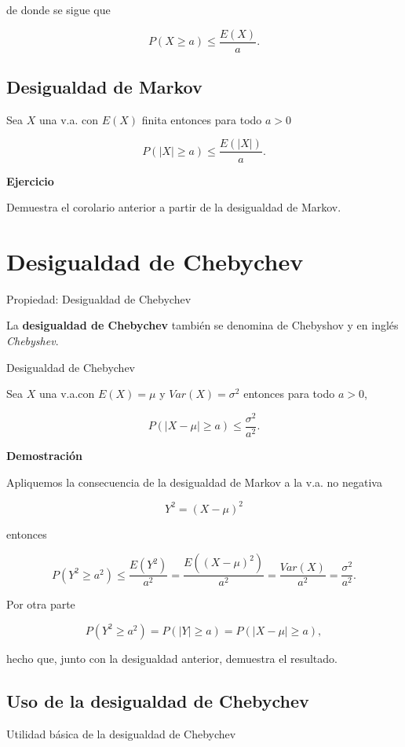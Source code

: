 \documentclass[
  letterpaper,
  DIV=11,
  numbers=noendperiod]{scrreprt}
\begin{document}
de donde se sigue que

\[P(X\geq a)\leq \frac{E(X)}{a}.\]

\subsection{Desigualdad de Markov}\label{desigualdad-de-markov-1}

Sea \(X\) una v.a. con \(E(X)\) finita entonces para todo \(a>0\)

\[P(|X|\geq a )\leq \frac{E(|X|)}{a}.\]

\textbf{Ejercicio}

Demuestra el corolario anterior a partir de la desigualdad de Markov.

\section{Desigualdad de Chebychev}\label{desigualdad-de-chebychev}

Propiedad: Desigualdad de Chebychev

La \textbf{desigualdad de Chebychev} también se denomina de Chebyshov y
en inglés \emph{Chebyshev}.

Desigualdad de Chebychev

Sea \(X\) una v.a.con \(E(X)=\mu\) y \(Var(X)=\sigma^2\) entonces para
todo \(a>0\),

\[P(|X-\mu|\geq a)\leq \frac{\sigma^2}{a^2}.\]

\textbf{Demostración}

Apliquemos la consecuencia de la desigualdad de Markov a la v.a. no
negativa

\[Y^2=(X-\mu)^2\]

entonces

\[
P(Y^2\geq a^2) \leq 
\frac{E(Y^2)}{a^2}=\frac{E((X-\mu)^2)}{a^2}
= \frac{Var(X)}{a^2}=\frac{\sigma^2}{a^2}
.
\]

Por otra parte

\[
P(Y^2\geq a^2)=P(|Y|\geq a)= P(|X-\mu|\geq a),
\]

hecho que, junto con la desigualdad anterior, demuestra el resultado.

\subsection{Uso de la desigualdad de
Chebychev}\label{uso-de-la-desigualdad-de-chebychev}

Utilidad básica de la desigualdad de Chebychev
\end{document}
